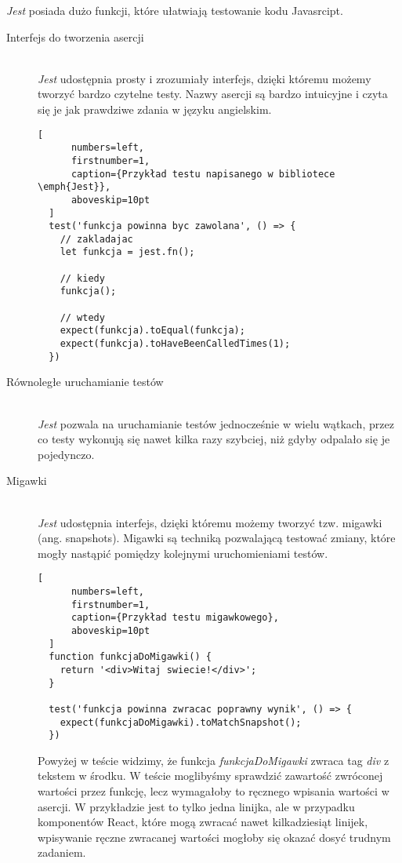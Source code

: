 \emph{Jest} posiada dużo funkcji, które ułatwiają testowanie kodu Javasrcipt.
\begin{description}
  \item[Interfejs do tworzenia asercji] \hfill \\ \emph{Jest} udostępnia prosty i zrozumiały interfejs, dzięki któremu możemy tworzyć bardzo czytelne testy. Nazwy asercji są bardzo intuicyjne i czyta się je jak prawdziwe zdania w języku angielskim.
  \begin{addmargin}[6mm]{0mm}
  \begin{lstlisting}[
      numbers=left,
      firstnumber=1,
      caption={Przykład testu napisanego w bibliotece \emph{Jest}},
      aboveskip=10pt
  ]
  test('funkcja powinna byc zawolana', () => {
    // zakladajac
    let funkcja = jest.fn();

    // kiedy
    funkcja();

    // wtedy
    expect(funkcja).toEqual(funkcja);
    expect(funkcja).toHaveBeenCalledTimes(1);
  })
  \end{lstlisting}
  \end{addmargin}


  \vspace{0.4cm}

  \item[Równoległe uruchamianie testów] \hfill \\ \emph{Jest} pozwala na uruchamianie testów jednocześnie w wielu wątkach, przez co testy wykonują się nawet kilka razy szybciej, niż gdyby odpalało się je pojedynczo.

  \vspace{0.4cm}

  \item[Migawki] \hfill \\ \emph{Jest} udostępnia interfejs, dzięki któremu możemy tworzyć tzw. migawki (ang. snapshots). Migawki są techniką pozwalającą testować zmiany, które mogły nastąpić pomiędzy kolejnymi uruchomieniami testów.
  \begin{addmargin}[6mm]{0mm}
  \begin{lstlisting}[
      numbers=left,
      firstnumber=1,
      caption={Przykład testu migawkowego},
      aboveskip=10pt
  ]
  function funkcjaDoMigawki() {
    return '<div>Witaj swiecie!</div>';
  }

  test('funkcja powinna zwracac poprawny wynik', () => {
    expect(funkcjaDoMigawki).toMatchSnapshot();
  })
  \end{lstlisting}
  \end{addmargin}
  Powyżej w teście widzimy, że funkcja \emph{funkcjaDoMigawki} zwraca tag \emph{div} z tekstem w środku. W teście moglibyśmy sprawdzić zawartość zwróconej wartości przez funkcję, lecz wymagałoby to ręcznego wpisania wartości w asercji. W przykładzie jest to tylko jedna linijka, ale w przypadku komponentów React, które mogą zwracać nawet kilkadziesiąt linijek, wpisywanie ręczne zwracanej wartości mogłoby się okazać dosyć trudnym zadaniem.


\end{description}
